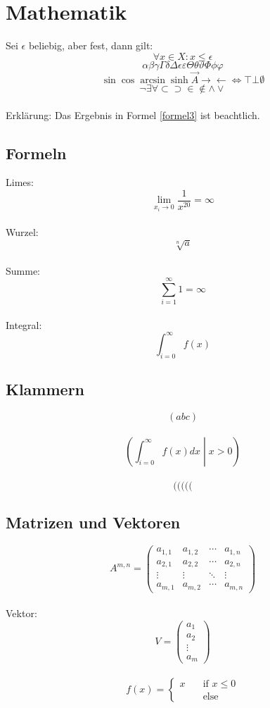 \documentclass{report}
\begin{document}
	
	\chapter{Mathematik}
	Sei $\epsilon$ beliebig, aber fest, dann gilt:
	$$ \forall x \in X: x \leq \epsilon $$
	\begin{equation} 
		\alpha \beta \gamma \Gamma \delta \Delta \epsilon \varepsilon \Theta \theta \vartheta \Phi \phi \varphi
	\end{equation}
	\begin{equation}
		\sin \cos \arcsin \sinh \vec{A}
		\rightarrow \leftarrow \Leftrightarrow \top \bot \emptyset
	\end{equation}
	\begin{equation} \tag{2}
		\neg \exists \forall \subset \supset \in \notin \land \lor
		\label{formel3}
	\end{equation}
	\\
	Erklärung: Das Ergebnis in Formel \ref{formel3} ist beachtlich.
	
	\section{Formeln}
	Limes:
	$$ \lim_{x_{i} \to 0} \frac{1}{x^{20}} = \infty $$
	\\ Wurzel:
	$$ \sqrt[n]{a} $$
	\\ Summe:
	$$ \sum_{i=1}^{\infty} 1 = \infty $$
	\\ Integral:
	$$ \int_{i=0}^{\infty} f(x) $$
	
	\section{Klammern}
	$$ (abc) $$
	\\
	$$ \left (\int_{i=0}^{\infty} f(x) dx \middle | x > 0 \right) $$ 
	\\
	$$ ( \big( \Big( \bigg( \Bigg( $$
	
	\section{Matrizen und Vektoren}
	
	$$ A^{m,n} = \begin{pmatrix}
		a_{1,1} & a_{1,2} & \cdots & a_{1,n} \\
		a_{2,1} & a_{2,2} & \cdots & a_{2,n} \\
		\vdots 	& \vdots  & \ddots & \vdots  \\
		a_{m,1} & a_{m,2} & \cdots & a_{m,n}
	\end{pmatrix} $$
	\\
	Vektor:
		$$ V = \begin{pmatrix}
		a_{1} \\
		a_{2}  \\
		\vdots 	\\
		a_{m}
	\end{pmatrix} $$
	\\
	$$ f(x) = \begin{cases}
		x & \quad \text{if } x \leq 0 \\
		~ &  \quad \text{else}
	\end{cases}$$
\end{document}
